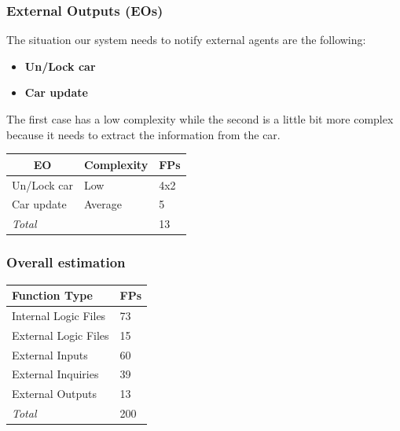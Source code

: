 \documentclass[english]{article}
\begin{document}
\subsubsection{External Outputs (EOs)}

The situation our system needs to notify external agents are the following:

\begin{itemize}
	\item{\textbf{Un/Lock car}}

	\item{\textbf{Car update}}
\end{itemize}

The first case has a low complexity while the second is a little bit more complex because it needs to extract the information from the car.

\begin{center}
	\begin{tabular}{ |p{8cm}|m{2cm}|p{1cm}| }
		\hline
		\multicolumn{1}{|c|}{\textbf{EO}} & \multicolumn{1}{c|}{\textbf{Complexity}} & \multicolumn{1}{c|}{\textbf{FPs}} \\
		\hline
		Un/Lock car & Low & 4x2 \\
		\hline
		Car update & Average & 5\\
		\hline
		\multicolumn{2}{|l|}{\textit{Total}} & \multicolumn{1}{l|}{13}\\
		\hline
	\end{tabular}
\end{center}

\subsubsection{Overall estimation}

\begin{center}
	\begin{tabular}{|p{5cm}|p{1cm}|}
		\hline
		\textbf{Function Type} & \textbf{FPs} \\
		\hline
		Internal Logic Files & 73 \\
		External Logic Files & 15 \\
		External Inputs & 60 \\
		External Inquiries & 39 \\
		External Outputs & 13 \\
		\hline
		\textit{Total} & 200 \\
		\hline
	\end{tabular}
\end{center}
\end{document}
